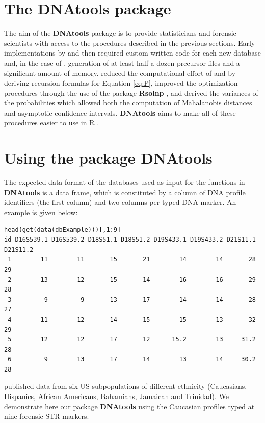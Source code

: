 \documentclass[a4paper,11pt]{article}
\newcommand{\proglang}[1]{\textsf{#1}}
\newcommand{\pkg}[1]{\textbf{#1}}
\begin{document}
\section[DNAtools]{The \pkg{DNAtools} package}
The aim of the \pkg{DNAtools} package is to provide statisticians and
forensic scientists with access to the procedures described in the
previous sections. Early implementations by \cite{weir2004} and then
\cite{curran2007} required custom written code for each new database
and, in the case of \cite{curran2007}, generation of at least half a
dozen precursor files and a significant amount of memory.
\cite{tvedebrink2010,tvedebrink2011} reduced the computational
effort of \cite{weir2004} and \cite{curran2007} by deriving
recursion formulas for Equation \ref{eq:P}, improved the optimization
procedures through the use of the package \pkg{Rsolnp} \citep{Rsolnp},
and derived the variances of the probabilities which allowed both the
computation of Mahalanobis distances and asymptotic confidence
intervals. \pkg{DNAtools} aims to make all of these procedures easier
to use in \proglang{R} \citep{rcore2010}.

\section[Using DNAtools]{Using the package \pkg{DNAtools}}
\label{sec:package}

The expected data format of the databases used as input for the
functions in \pkg{DNAtools} is a data frame, which is constituted by a
column of DNA profile identifiers (the first column) and two columns
per typed DNA marker. An example is given below: 
\begin{verbatim}
head(get(data(dbExample)))[,1:9]
id D16S539.1 D16S539.2 D18S51.1 D18S51.2 D19S433.1 D19S433.2 D21S11.1 D21S11.2
 1        11        11       15       21        14        14       28       29
 2        13        12       15       14        16        16       29       28
 3         9         9       13       17        14        14       28       27
 4        11        12       14       15        15        13       32       29
 5        12        12       17       12      15.2        13     31.2       28
 6         9        13       17       14        13        14     30.2       28
\end{verbatim}

\cite{budowle_1999} published data from six US subpopulations of
different ethnicity (Caucasians, Hispanics, African Americans,
Bahamians, Jamaican and Trinidad). We demonstrate here our package
\pkg{DNAtools} using the Caucasian profiles typed at nine forensic STR
markers.
\end{document}
